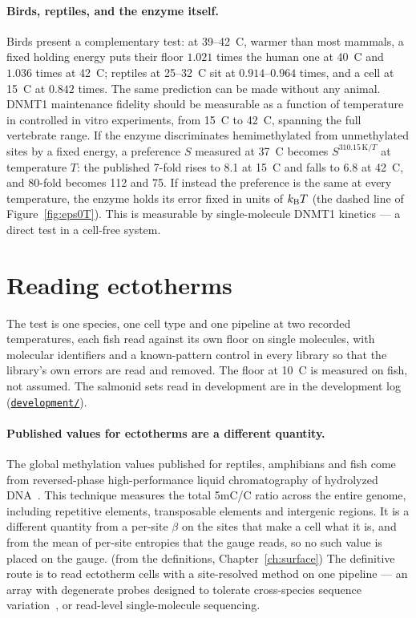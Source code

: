\paragraph{Birds, reptiles, and the enzyme itself.} Birds present a complementary test: at 39--42~\textdegree C, warmer than
most mammals, a fixed holding energy puts their floor $1.021$ times the human one at 40~\textdegree C and $1.036$ times at
42~\textdegree C; reptiles at 25--32~\textdegree C sit at $0.914$--$0.964$ times, and a cell at 15~\textdegree C at
$0.842$ times. \calc{} The same prediction can be made without any animal. DNMT1 maintenance fidelity should be
measurable as a function of temperature in controlled in vitro experiments, from 15~\textdegree C to 42~\textdegree C,
spanning the full vertebrate range. If the enzyme discriminates hemimethylated from unmethylated sites by a fixed energy, a
preference $S$ measured at 37~\textdegree C becomes $S^{310.15\,\mathrm{K}/T}$ at temperature $T$: the published 7-fold rises
to 8.1 at 15~\textdegree C and falls to 6.8 at 42~\textdegree C, and 80-fold becomes 112 and 75. \calc{} If instead the
preference is the same at every temperature, the enzyme holds its error fixed in units of $k_{\mathrm B} T$ (the dashed line of
Figure~\ref{fig:eps0T}). This is measurable by single-molecule DNMT1 kinetics --- a direct test in a cell-free system.
\prediction

\section{Reading ectotherms}

The test is one species, one cell type and one pipeline at two recorded temperatures, each fish read against its own floor on single
molecules, with molecular identifiers and a known-pattern control in every library so that the library's own errors are read and removed.
The floor at 10~\textdegree C is measured on fish, not assumed. \prediction{} The salmonid sets read in development are in the
development log (\href{https://github.com/hmahaffeyges/IAM-Validation/tree/main/development}{\texttt{development/}}).

\paragraph{Published values for ectotherms are a different quantity.} The global methylation values published for reptiles,
amphibians and fish come from reversed-phase high-performance liquid chromatography of hydrolyzed
DNA~\cite{Varriale2006_fish,Varriale2006_reptile}. This technique measures the total 5mC/C ratio across the entire genome,
including repetitive elements, transposable elements and intergenic regions. \observed{} It is a different quantity from
a per-site $\beta$ on the sites that make a cell what it is, and from the mean of per-site entropies that the gauge reads, so
no such value is placed on the gauge. \derived{} (from the definitions, Chapter~\ref{ch:surface}) The definitive route
is to read ectotherm cells with a site-resolved method on one pipeline --- an array with degenerate probes designed to
tolerate cross-species sequence variation~\cite{Arneson2022}, or read-level single-molecule sequencing.


